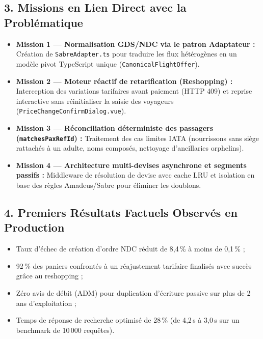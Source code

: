 \documentclass[11pt,a4paper]{article}
\begin{document}
\subsection*{3. Missions en Lien Direct avec la Problématique}
\begin{itemize}[itemsep=3pt]
    \item \textbf{Mission 1 — Normalisation GDS/NDC via le patron Adaptateur :} Création de \texttt{SabreAdapter.ts} pour traduire les flux hétérogènes en un modèle pivot TypeScript unique (\texttt{CanonicalFlightOffer}).
    \item \textbf{Mission 2 — Moteur réactif de retarification (Reshopping) :} Interception des variations tarifaires avant paiement (HTTP 409) et reprise interactive sans réinitialiser la saisie des voyageurs (\texttt{PriceChangeConfirmDialog.vue}).
    \item \textbf{Mission 3 — Réconciliation déterministe des passagers (\texttt{matchesPaxRefId}) :} Traitement des cas limites IATA (nourrissons sans siège rattachés à un adulte, noms composés, nettoyage d'ancillaries orphelins).
    \item \textbf{Mission 4 — Architecture multi-devises asynchrone et segments passifs :} Middleware de résolution de devise avec cache LRU et isolation en base des règles Amadeus/Sabre pour éliminer les doublons.
\end{itemize}

\subsection*{4. Premiers Résultats Factuels Observés en Production}
\begin{itemize}[itemsep=2pt]
    \item Taux d'échec de création d'ordre NDC réduit de 8,4\,\% à moins de 0,1\,\% ;
    \item 92\,\% des paniers confrontés à un réajustement tarifaire finalisés avec succès grâce au reshopping ;
    \item Zéro avis de débit (ADM) pour duplication d'écriture passive sur plus de 2 ans d'exploitation ;
    \item Temps de réponse de recherche optimisé de 28\,\% (de 4,2\,s à 3,0\,s sur un benchmark de 10\,000 requêtes).
\end{itemize}
\end{document}
